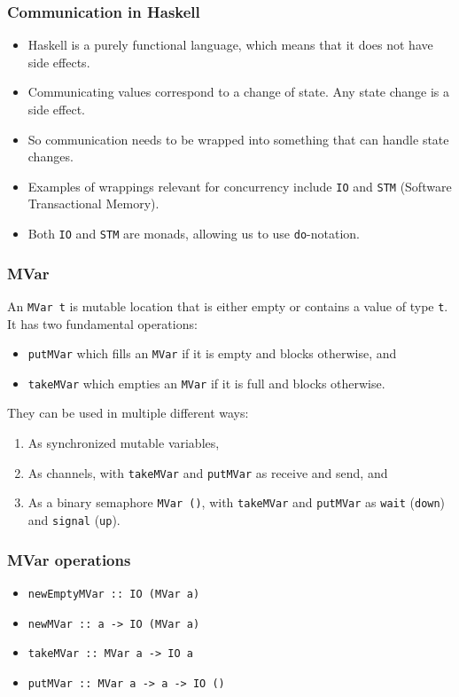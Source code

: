 \documentclass[notheorems]{beamer}%
\theoremstyle{definition}
\begin{document}
\begin{frame}[fragile]
  \frametitle{Communication in Haskell}
  \begin{itemize}
  \item Haskell is a purely functional language, which means that it does not
    have \alert{side effects}.
  \item Communicating values correspond to a change of state. Any state change
    is a side effect.
  \item So communication needs to be wrapped into something that can handle
    state changes.
  \item Examples of wrappings relevant for concurrency include \verb-IO- and
    \verb-STM- (Software Transactional Memory).
  \item Both \verb-IO- and \verb-STM- are monads, allowing us to use
    \verb-do--notation.
  \end{itemize}
\end{frame}

\begin{frame}[fragile]
  \frametitle{MVar}
  An \verb-MVar t- is mutable location that is either empty or contains a
  value of type \verb-t-. It has two fundamental operations:
  \begin{itemize}
  \item \verb-putMVar- which fills an \verb-MVar- if it is empty and
    blocks otherwise, and
  \item \verb-takeMVar- which empties an \verb-MVar- if it is full and
    blocks otherwise.
  \end{itemize}

  They can be used in multiple different ways:
  \begin{enumerate}
  \item As synchronized \alert{mutable variables},
  \item As \alert{channels}, with \verb-takeMVar- and \verb-putMVar- as
    receive and send, and
  \item As a \alert{binary semaphore} \verb-MVar ()-, with \verb-takeMVar- and
    \verb-putMVar- as \verb-wait- (\verb-down-) and \verb-signal- (\verb-up-).
  \end{enumerate}
\end{frame}

\begin{frame}[fragile]
  \frametitle{MVar operations}
  \begin{itemize}
  \item \verb=newEmptyMVar :: IO (MVar a)=
  \item \verb=newMVar :: a -> IO (MVar a)=
  \item \verb=takeMVar :: MVar a -> IO a=
  \item \verb=putMVar :: MVar a -> a -> IO ()=
  \end{itemize}
\end{frame}
\end{document}
